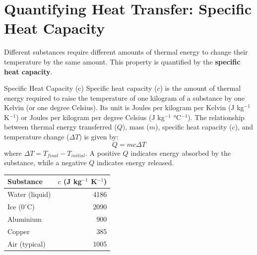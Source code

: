 \FloatBarrier

\section{Quantifying Heat Transfer: Specific Heat Capacity}
\label{sec:specific_heat}
\FloatBarrier

Different substances require different amounts of thermal energy to change their temperature by the same amount. This property is quantified by the \textbf{specific heat capacity}.

\begin{keyconcept}{Specific Heat Capacity (c)}
Specific heat capacity (\(c\)) is the amount of thermal energy required to raise the temperature of one kilogram of a substance by one Kelvin (or one degree Celsius). Its unit is Joules per kilogram per Kelvin (J kg\(^{-1}\) K\(^{-1}\)) or Joules per kilogram per degree Celsius (J kg\(^{-1}\) °C\(^{-1}\)). The relationship between thermal energy transferred (\(Q\)), mass (\(m\)), specific heat capacity (\(c\)), and temperature change (\(\Delta T\)) is given by:
\begin{equation}
Q = mc\Delta T
\label{eq:specific_heat}
\end{equation}
where \(\Delta T = T_{final} - T_{initial}\). A positive \(Q\) indicates energy absorbed by the substance, while a negative \(Q\) indicates energy released.
\end{keyconcept}



\begin{marginfigure}[-10pt]
\centering
\small %
\begin{tabular}{lr}
\toprule
Substance & \(c\) (J kg\(^{-1}\) K\(^{-1}\)) \\
\midrule
Water (liquid) & 4186 \\
Ice (\(0^\circ\)C) & 2090 \\
Aluminium & 900 \\
Copper & 385 \\
Air (typical) & 1005 \\
\bottomrule
\end{tabular}
\caption{Approximate specific heat capacities of common substances. Note water's high value.}
\label{tab:specific_heat}
\end{marginfigure}

